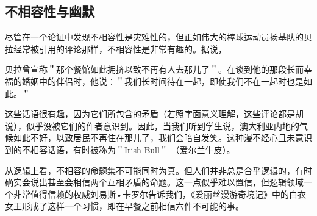 \subsection{不相容性与幽默}

尽管在一个论证中发现不相容性是灾难性的，但正如伟大的棒球运动员扬基队的贝拉经常被引用的评论那样，不相容性是非常有趣的。据说，

贝拉曾宣称＂那个餐馆如此拥挤以致不再有人去那儿了＂。在谈到他的那段长而幸福的婚姻中的伴侣时，他说：＂我们长时间待在一起，即使我们不在一起时也是如此。＂

这些话语很有趣，因为它们所包含的矛盾（若照字面意义理解，这些评论都是胡说），似乎没被它们的作者意识到。因此，当我们听到学生说，澳大利亚内地的气候如此不好，以致居民不再住在那儿了，我们会暗自发笑。这种漫不经心且未意识到的不相容话语，有时被称为＂Irish Bull＂ （爱尔兰牛皮）。

从逻辑上看，不相容的命题集不可能同时为真。但人们并非总是合乎逻辑的，有时确实会说出甚至会相信两个互相矛盾的命题。这一点似乎难以置信，但逻辑领域一个非常值得信赖的权威刘易斯•卡罗尔告诉我们，《爱丽丝漫游奇境记》中的白衣女王形成了这样一个习惯，即在早餐之前相信六件不可能的事。 

\begin{center}
\end{center} 